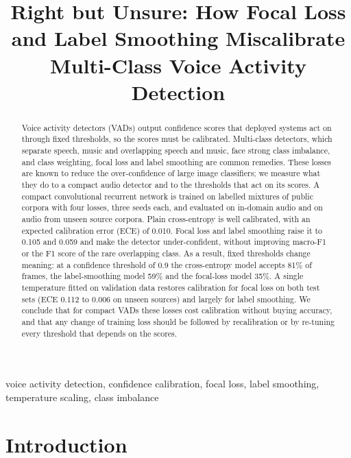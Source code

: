 \documentclass[conference]{IEEEtran}
\begin{document}
\title{Right but Unsure: How Focal Loss and Label Smoothing Miscalibrate Multi-Class Voice Activity Detection}

\maketitle

\begin{abstract}
Voice activity detectors (VADs) output confidence scores that deployed systems act on through fixed thresholds, so the scores must be calibrated. Multi-class detectors, which separate speech, music and overlapping speech and music, face strong class imbalance, and class weighting, focal loss and label smoothing are common remedies. These losses are known to reduce the over-confidence of large image classifiers; we measure what they do to a compact audio detector and to the thresholds that act on its scores. A compact convolutional recurrent network is trained on labelled mixtures of public corpora with four losses, three seeds each, and evaluated on in-domain audio and on audio from unseen source corpora. Plain cross-entropy is well calibrated, with an expected calibration error (ECE) of 0.010. Focal loss and label smoothing raise it to 0.105 and 0.059 and make the detector under-confident, without improving macro-F1 or the F1 score of the rare overlapping class. As a result, fixed thresholds change meaning: at a confidence threshold of 0.9 the cross-entropy model accepts 81\% of frames, the label-smoothing model 59\% and the focal-loss model 35\%. A single temperature fitted on validation data restores calibration for focal loss on both test sets (ECE 0.112 to 0.006 on unseen sources) and largely for label smoothing. We conclude that for compact VADs these losses cost calibration without buying accuracy, and that any change of training loss should be followed by recalibration or by re-tuning every threshold that depends on the scores.
\end{abstract}

\begin{IEEEkeywords}
voice activity detection, confidence calibration, focal loss, label smoothing, temperature scaling, class imbalance
\end{IEEEkeywords}

\section{Introduction}
\end{document}
